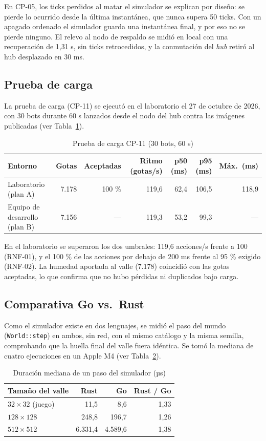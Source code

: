 \documentclass[11pt,letterpaper]{article}
\begin{document}
En CP-05, los ticks perdidos al matar el simulador se explican por diseño: se pierde lo ocurrido desde la última instantánea, que nunca supera 50 ticks. Con un apagado ordenado el simulador guarda una instantánea final, y por eso no se pierde ninguno. El relevo al nodo de respaldo se midió en local con una recuperación de 1,31 s, sin ticks retrocedidos, y la conmutación del \textit{hub} retiró al hub desplazado en 30 ms.

\subsection{Prueba de carga}

La prueba de carga (CP-11) se ejecutó en el laboratorio el 27 de octubre de 2026, con 30 bots durante 60 s lanzados desde el nodo del hub contra las imágenes publicadas (ver Tabla~\ref{tab:carga}).

\begin{table}[H]
\centering\small
\caption{Prueba de carga CP-11 (30 bots, 60 s)}
\label{tab:carga}
\begin{tabular}{@{}lrrrrrr@{}}
\toprule
Entorno & Gotas & Aceptadas & Ritmo (gotas/s) & p50 (ms) & p95 (ms) & Máx.\ (ms) \\
\midrule
Laboratorio (plan A) & 7.178 & 100 \% & 119,6 & 62,4 & 106,5 & 118,9 \\
Equipo de desarrollo (plan B) & 7.156 & — & 119,3 & 53,2 & 99,3 & — \\
\bottomrule
\end{tabular}
\end{table}

En el laboratorio se superaron los dos umbrales: 119,6 acciones/s frente a 100 (RNF-01), y el 100 \% de las acciones por debajo de 200 ms frente al 95 \% exigido (RNF-02). La humedad aportada al valle (7.178) coincidió con las gotas aceptadas, lo que confirma que no hubo pérdidas ni duplicados bajo carga.

\subsection{Comparativa Go vs.\ Rust}

Como el simulador existe en dos lenguajes, se midió el paso del mundo (\texttt{World::step}) en ambos, sin red, con el mismo catálogo y la misma semilla, comprobando que la huella final del valle fuera idéntica. Se tomó la mediana de cuatro ejecuciones en un Apple M4 (ver Tabla~\ref{tab:bench}).

\begin{table}[H]
\centering\small
\caption{Duración mediana de un paso del simulador (µs)}
\label{tab:bench}
\begin{tabular}{@{}lrrr@{}}
\toprule
Tamaño del valle & Rust & Go & Rust / Go \\
\midrule
$32 \times 32$ (juego) & 11,5 & 8,6 & 1,33 \\
$128 \times 128$ & 248,8 & 196,7 & 1,26 \\
$512 \times 512$ & 6.331,4 & 4.589,6 & 1,38 \\
\bottomrule
\end{tabular}
\end{table}
\end{document}
